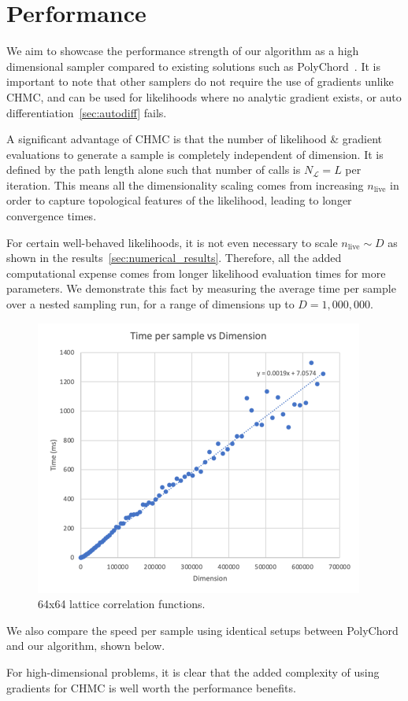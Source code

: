 \documentclass[11pt]{article}
\begin{document}
\section{Performance}\label{sec:performance}
    We aim to showcase the performance strength of our algorithm as a high dimensional sampler compared to existing
    solutions such as PolyChord~\cite{Handley_2015}.
    It is important to note that other samplers do not require the use of gradients unlike CHMC, and can be used for
    likelihoods where no analytic gradient exists, or auto differentiation~\eqref{sec:autodiff} fails.

    A significant advantage of CHMC is that the number of likelihood \& gradient evaluations to generate a sample is
    completely independent of dimension.
    It is defined by the path length alone such that number of calls is $N_{\mathcal{L}} = L$ per iteration.
    This means all the dimensionality scaling comes from increasing $n_{\text{live}}$ in order to capture topological
    features of the likelihood, leading to longer convergence times.

    For certain well-behaved likelihoods, it is not even necessary to scale $n_{\text{live}} \sim D$ as shown in the
    results~\eqref{sec:numerical_results}.
    Therefore, all the added computational expense comes from longer likelihood evaluation times for more parameters.
    We demonstrate this fact by measuring the average time per sample over a nested sampling run, for a range of
    dimensions up to $D = 1,000,000$.

    \begin{figure}[t!]
        \center
        \includegraphics[width=\linewidth]{../figures/Performance}
        \caption{
            64x64 lattice correlation functions.
        }\label{fig:performance}
    \end{figure}

    We also compare the speed per sample using identical setups between PolyChord and our algorithm, shown below.

    For high-dimensional problems, it is clear that the added complexity of using gradients for CHMC is well worth the
    performance benefits.
\end{document}
